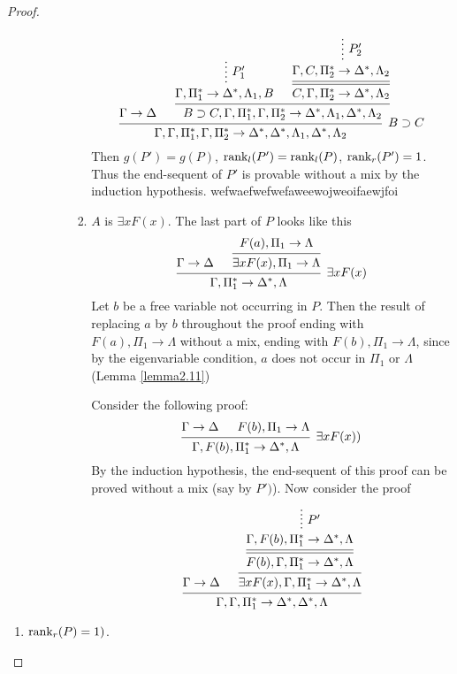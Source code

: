 \documentclass[11pt]{article}
\begin{document}
\begin{proof}
\begin{enumerate}
\begin{enumerate}
\begin{enumerate}
\begin{enumerate}
\begin{equation*}
\begin{prooftree}
\hypo{\Gamma\to\Delta}
\hypo{}
\ellipsis{\(P_1'\)}{\Gamma,\Pi_1^*\to\Delta^*,\Lambda_1,B}
\hypo{}
\ellipsis{\(P_2'\)}{\Gamma,C,\Pi_2^*\to\Delta^*,\Lambda_2}
\infer[double]1{C,\Gamma,\Pi_2^*\to\Delta^*,\Lambda_2}
\infer2{B\supset C,\Gamma,\Pi_1^*,\Gamma,\Pi_2^*\to\Delta^*,\Lambda_1,
\Delta^*,\Lambda_2}
\infer2[\(B\supset C\)]{\Gamma,\Gamma,\Pi_1^*,\Gamma,\Pi_2^*\to\Delta^*,
\Delta^*,\Lambda_1,\Delta^*,\Lambda_2}
\end{prooftree}
\end{equation*}
Then \(g(P')=g(P)\), \(\text{rank}_l(P')=\text{rank}_l(P)\), \(\text{rank}_r(P')=1\). Thus the
end-sequent of \(P'\) is provable without a mix by the induction hypothesis.
wefwaefwefwefaweewojweoifaewjfoi

\item \(A\) is \(\exists xF(x)\). The last part of \(P\) looks like this
\begin{equation*}
\begin{prooftree}%
\hypo{\Gamma\to\Delta}
\hypo{F(a),\Pi_1\to\Lambda}
\infer1{\exists xF(x),\Pi_1\to\Lambda}
\infer2[\(\exists xF(x)\)]{\Gamma,\Pi_1^*\to\Delta^*,\Lambda}
\end{prooftree}
\end{equation*}
Let \(b\) be a free variable not occurring in \(P\). Then the result of
replacing \(a\) by \(b\) throughout the proof ending with \(F(a),\Pi_1\to\Lambda\)
without a mix, ending with \(F(b),\Pi_1\to\Lambda\), since by the eigenvariable
condition, \(a\) does not occur in \(\Pi_1\) or \(\Lambda\) (Lemma \ref{lemma2.11})

Consider the following proof:
\begin{equation*}
\begin{prooftree}%
\hypo{\Gamma\to\Delta}
\hypo{F(b),\Pi_1\to\Lambda}
\infer2[\(\exists xF(x))\)]{\Gamma,F(b),\Pi^*_1\to\Delta^*,\Lambda}
\end{prooftree}
\end{equation*}
By the induction hypothesis, the end-sequent of this proof can be proved without a
mix (say by \(P')\)). Now consider the proof
\begin{equation*} 
\begin{prooftree}%
\hypo{\Gamma\to\Delta}
\hypo{}
\ellipsis{\(P'\)}{\Gamma,F(b),\Pi_1^*\to\Delta^*,\Lambda}
\infer[double]1{F(b),\Gamma,\Pi_1^*\to\Delta^*,\Lambda}
\infer1{\exists xF(x),\Gamma,\Pi_1^*\to\Delta^*,\Lambda}
\infer2{\Gamma,\Gamma,\Pi_1^*\to\Delta^*,\Delta^*,\Lambda}
\end{prooftree}
\end{equation*}
\end{enumerate}
\end{enumerate}
\end{enumerate}
\end{enumerate}


\begin{enumerate}
\item \(\text{rank}_r(P)=1)\).
\end{enumerate}
\end{proof}
\end{document}
